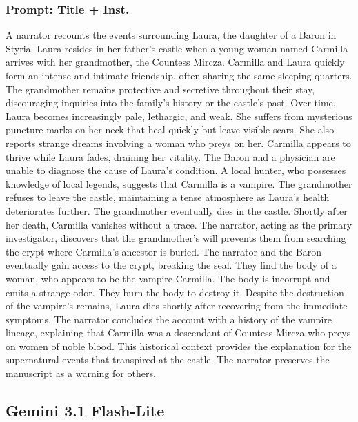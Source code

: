 \documentclass{article} %
\begin{document}
\subsubsection{Prompt: Title + Inst.}

A narrator recounts the events surrounding Laura, the daughter of a Baron in Styria. Laura resides in her father’s castle when a young woman named Carmilla arrives with her grandmother, the Countess Mircza. Carmilla and Laura quickly form an intense and intimate friendship, often sharing the same sleeping quarters. The grandmother remains protective and secretive throughout their stay, discouraging inquiries into the family's history or the castle's past. Over time, Laura becomes increasingly pale, lethargic, and weak. She suffers from mysterious puncture marks on her neck that heal quickly but leave visible scars. She also reports strange dreams involving a woman who preys on her. Carmilla appears to thrive while Laura fades, draining her vitality. The Baron and a physician are unable to diagnose the cause of Laura’s condition. \textcolor{skipred}{A local hunter, who possesses knowledge of local legends, suggests that Carmilla is a vampire. The grandmother refuses to leave the castle, maintaining a tense atmosphere as Laura’s health deteriorates further. The grandmother eventually dies in the castle. Shortly after her death, Carmilla vanishes without a trace. The narrator, acting as the primary investigator, discovers that the grandmother’s will prevents them from searching the crypt where Carmilla’s ancestor is buried.} The narrator and the Baron eventually gain access to the crypt, breaking the seal. \textcolor{skipred}{They find the body of a woman, who appears to be the vampire Carmilla. The body is incorrupt and emits a strange odor.} They burn the body to destroy it. \textcolor{skipred}{Despite the destruction of the vampire’s remains, Laura dies shortly after recovering from the immediate symptoms.} The narrator concludes the account with a history of the vampire lineage, explaining that Carmilla was a descendant of Countess Mircza who preys on women of noble blood. This historical context provides the explanation for the supernatural events that transpired at the castle. \textcolor{skipred}{The narrator preserves the manuscript as a warning for others.}


\subsection{Gemini 3.1 Flash-Lite}
\end{document}
